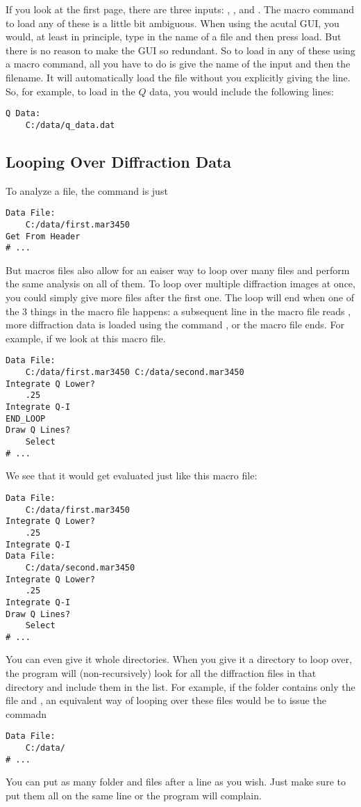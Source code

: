 If you look at the first page, there are three inputs:
, , and 
. The macro command to load any of these
is a little bit ambiguous. When using the acutal GUI, 
you would, at least in principle, type in the name of
a file and then press load. But there is no reason to
make the GUI so redundant. So to load in any of these
using a macro command, all you have to do is give the 
name of the input and then the filename. It will 
automatically load the file without you explicitly
giving the  line. So, for example,
to load in the $Q$ data, you would include the 
following lines:
\begin{lstlisting}[caption={'Load the $Q$ Data'}]
Q Data:
    C:/data/q_data.dat
\end{lstlisting}

\subsection{Looping Over Diffraction Data}
\label{LoopOverDiffractionData}

To analyze a file, the command is just 
\begin{lstlisting}[caption={'Load the Diffraction Data'}]
Data File:
    C:/data/first.mar3450
Get From Header
# ...
\end{lstlisting}
But macros files also allow for an eaiser way
to loop over many files and perform the same
analysis on all of them.  
To loop over multiple diffraction images at once,
you could simply give more files after the first 
one. The loop will end when 
one of the 3 things in the macro 
file happens: a subsequent line in the macro
file reads , more diffraction data
is loaded using the command , or
the macro file ends. For example, if we look at this 
macro file.
\begin{lstlisting}[caption={'Loop Over Diffraction Data'}]
Data File:
    C:/data/first.mar3450 C:/data/second.mar3450 
Integrate Q Lower?
    .25
Integrate Q-I
END_LOOP
Draw Q Lines?
    Select
# ...
\end{lstlisting}
We see that it would get evaluated just like this
macro file:
\begin{lstlisting}[caption={'An Equivalent Macro'}]
Data File:
    C:/data/first.mar3450 
Integrate Q Lower?
    .25
Integrate Q-I
Data File:
    C:/data/second.mar3450 
Integrate Q Lower?
    .25
Integrate Q-I
Draw Q Lines?
    Select
# ...
\end{lstlisting}
You can even give it whole directories. When
you give it a directory to loop over, the program 
will (non-recursively) look for all the diffraction 
files in that directory and include them in the list. 
For example, if the folder  contains
only the file  and
, an equivalent way of looping
over these files would be to issue the commadn
\begin{lstlisting}[caption={'Load the Diffraction Data'}]
Data File:
    C:/data/
# ...
\end{lstlisting}
You can put as many folder and files after a 
 line as you wish.
Just make sure to put them all on the same line 
or the program will complain.

